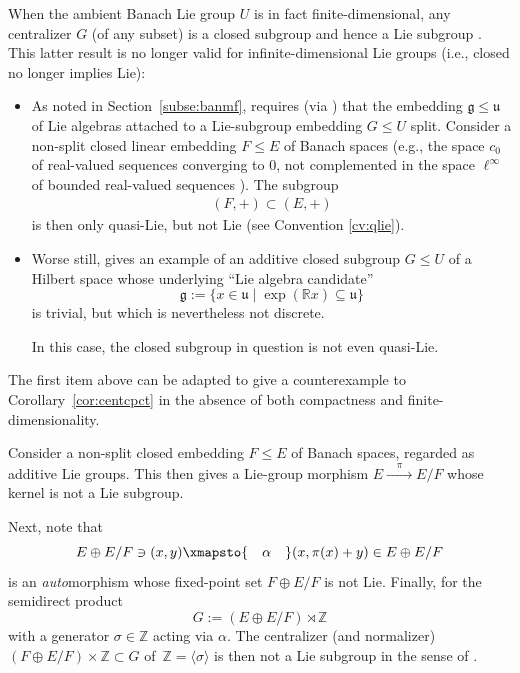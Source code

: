 \documentclass[10pt,a4paper]{amsart}
\numberwithin{equation}{section}
\newcommand\bR{{\mathbb R}}
\newcommand\bZ{{\mathbb Z}}
\newcommand\fg{{\mathfrak g}}
\newcommand\fu{{\mathfrak u}}
\begin{document}
When the ambient Banach Lie group $U$ is in fact finite-dimensional, any centralizer $G$ (of any subset) is a closed subgroup and hence a Lie subgroup \cite[Section~III.8.2, Theorem 2]{bourb-lie-13}. This latter result is no longer valid for infinite-dimensional Lie groups (i.e., closed no longer implies Lie):
\begin{itemize}\itemsep=0pt
\item As noted in Section~\ref{subse:banmf}, \cite[Section~III.1.3, Definition 3]{bourb-lie-13} requires (via \cite[Section~5.8.3]{bourb-vars-17}) that the embedding $\fg\le \fu$ of Lie algebras attached to a Lie-subgroup embedding $G\le U$ split. Consider a non-split closed linear embedding $F\le E$ of Banach spaces (e.g., the space $c_0$ of real-valued sequences converging to 0, not complemented in the space $\ell^{\infty}$ of bounded real-valued sequences \cite[Example 14-4-9]{wil-tvs}). The subgroup
 \begin{gather*}
 (F,+)\subset (E,+)
 \end{gather*}
 is then only quasi-Lie, but not Lie (see Convention \ref{cv:qlie}).
\item Worse still, \cite[Remark IV.4 (d)]{neeb-inf} gives an example of an additive closed subgroup $G\le U$ of a Hilbert space whose underlying ``Lie algebra candidate''~\cite[Corollary IV.3]{neeb-inf}
 \begin{equation*}
 \fg:=\{x\in \fu\mid \exp(\bR x)\subseteq \fu\}
 \end{equation*}
is trivial, but which is nevertheless not discrete.

 In this case, the closed subgroup in question is not even quasi-Lie.
\end{itemize}

The first item above can be adapted to give a counterexample to Corollary~\ref{cor:centcpct} in the absence of both compactness and finite-dimensionality.

\begin{Example}\label{ex:notlie}
 Consider a non-split closed embedding $F\le E$ of Banach spaces, regarded as additive Lie groups. This then gives a Lie-group morphism $E\xrightarrow{\quad\pi\quad} E/F$ whose kernel is not a Lie subgroup.

 Next, note that
 \begin{equation*}
 E\oplus E/F\ni (x,y)\xmapsto{\quad\alpha\quad}(x,\pi(x)+y)\in E\oplus E/F
 \end{equation*}
 is an {\it auto}morphism whose fixed-point set $F\oplus E/F$ is not Lie. Finally, for the semidirect product
 \begin{equation*}
 G:=\left(E\oplus E/F\right)\rtimes \bZ
 \end{equation*}
 with a generator $\sigma\in \bZ$ acting via $\alpha$. The centralizer (and normalizer) $(F\oplus E/F)\times \bZ\subset G$ of~$\bZ=\langle\sigma\rangle$ is then not a Lie subgroup in the sense of \cite[Section~III.1.3, Definition 3]{bourb-lie-13}.
\end{Example}
\end{document}
